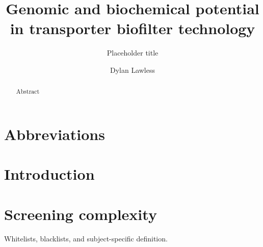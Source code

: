 \documentclass[preprint,11pt,fleqn]{elsarticle}
\begin{document}
\small

\begin{frontmatter}

\title{Genomic and biochemical potential in transporter biofilter technology}
    \author[add1]{Placeholder title }
\author[add1]{Dylan Lawless}
\address[add1]{Global Health Institute, School of Life Sciences, École Polytechnique Fédérale de Lausanne, Lausanne, 1015, Switzerland}


\begin{abstract}
Abstract
\end{abstract}
\end{frontmatter}

    \section*{Abbreviations}
    \noindent 


\section{Introduction}
\noindent

\section{Screening complexity}
Whitelists, blacklists, and subject-specific definition. 
\end{document}
